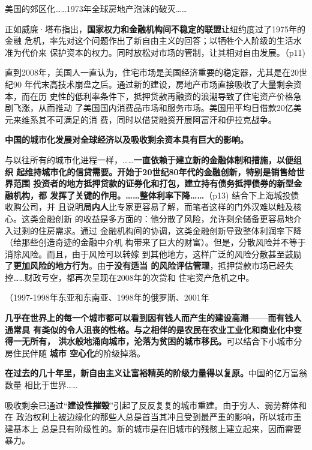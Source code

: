 美国的郊区化……1973年全球房地产泡沫的破灭……

正如威廉·塔布指出，\textbf{国家权力和金融机构间不稳定的联盟}让纽约度过了1975年的金融
危机，率先对这个问题作出了新自由主义的回答；以牺牲个人阶级的生活水准为代价来
保护资本的权力。同时放松对市场的管制，让其相对自由发展。（p11)




直到2008年，美国人一直认为，住宅市场是美国经济重要的稳定器，尤其是在20世纪90
年代末高技术崩盘之后。通过新的建设，房地产市场直接吸收了大量剩余资本，而在历
史性的低利率条件下，抵押贷款再融资的浪潮导致了住宅资产价格急剧飞涨，从而推动
了美国国内消费品市场和服务市场。美国用平均日借款20亿美元来维系其不可满足的消
费，同时以借贷融资开展阿富汗和伊拉克战争。

\textbf{中国的城市化发展对全球经济以及吸收剩余资本具有巨大的影响。}

与以往所有的城市化进程一样，……\textbf{一直依赖于建立新的金融体制和措施，以便组织
  起维持城市化的信贷需要。开始于20世纪80年代的金融创新，特别是销售给世界范围
  投资者的地方抵押贷款的证券化和打包，建立持有债务抵押债券的新型金融机构，都
  发挥了关键的作用。……整体利率下降……}（p13) 结合下上海城投债收购公司，并
且说明\textbf{局内人}比专家更容易了解，而笔者这样的门外汉难以触及核心。这类金融创新
的收益是多方面的：他分散了风险，允许剩余储备更容易地介入过剩的住房需求。通过
金融机构间的协调，这类金融创新导致整体利润率下降（给那些创造奇迹的金融中介机
构带来了巨大的财富）。但是，分散风险并不等于消除风险。而且，由于风险可以转嫁
到其他地方，这样广泛的风险分散甚至鼓励了\textbf{更加风险的地方行为}。由于\textbf{没有适当
的风险评估管理}，抵押贷款市场已经失控……财政亏空，都再次呈现在2008年的次贷和
住宅资产危机之中。

（1997-1998年东亚和东南亚、1998年的俄罗斯、2001年

\textbf{几乎在世界上的每一个城市都可以看到因有钱人而产生的建设高潮——而有钱人通常具
有类似的令人沮丧的性格。与之相伴的是农民在农业工业化和商业化中变得一无所有，
洪水般地涌向城市，沦落为贫困的城市移民。}可以结合下小城市分房住民伴随 \textbf{城市
空心化}的阶级掉落。

\textbf{在过去的几十年里，新自由主义让富裕精英的阶级力量得以复原。}中国的亿万富翁数量
相比于世界……

吸收剩余已通过“\textbf{建设性摧毁}”引起了反反复复的城市重建。由于穷人、弱势群体和在
政治权利上被边缘化的那些人总是首当其冲且受到最严重的影响，所以城市重建基本上
总是具有阶级性的。新的城市是在旧城市的残骸上建立起来，因而需要暴力。

